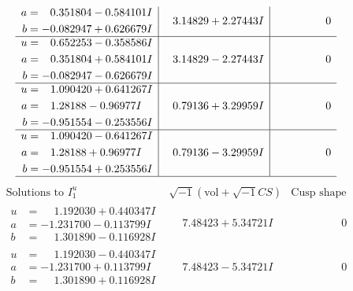 \documentclass[1p]{elsarticle_modified}
\theoremstyle{definition}
\newcommand{\I}{\sqrt{-1}}
\begin{document}
$$\begin{array}{c|c|c}
\begin{aligned}
a &= \phantom{-}0.351804 - 0.584101 I \\
b &= -0.082947 + 0.626679 I\end{aligned}
 & \phantom{-}3.14829 + 2.27443 I & \phantom{-0.000000 } 0 \\ \hline\begin{aligned}
u &= \phantom{-}0.652253 - 0.358586 I \\
a &= \phantom{-}0.351804 + 0.584101 I \\
b &= -0.082947 - 0.626679 I\end{aligned}
 & \phantom{-}3.14829 - 2.27443 I & \phantom{-0.000000 } 0 \\ \hline\begin{aligned}
u &= \phantom{-}1.090420 + 0.641267 I \\
a &= \phantom{-}1.28188 - 0.96977 I \\
b &= -0.951554 - 0.253556 I\end{aligned}
 & \phantom{-}0.79136 + 3.29959 I & \phantom{-0.000000 } 0 \\ \hline\begin{aligned}
u &= \phantom{-}1.090420 - 0.641267 I \\
a &= \phantom{-}1.28188 + 0.96977 I \\
b &= -0.951554 + 0.253556 I\end{aligned}
 & \phantom{-}0.79136 - 3.29959 I & \phantom{-0.000000 } 0\\
 \hline 
 \end{array}$$\newpage$$\begin{array}{c|c|c}  
\text{Solutions to }I^u_{1}& \I (\text{vol} + \sqrt{-1}CS) & \text{Cusp shape}\\
 \hline 
\begin{aligned}
u &= \phantom{-}1.192030 + 0.440347 I \\
a &= -1.231700 - 0.113799 I \\
b &= \phantom{-}1.301890 - 0.116928 I\end{aligned}
 & \phantom{-}7.48423 + 5.34721 I & \phantom{-0.000000 } 0 \\ \hline\begin{aligned}
u &= \phantom{-}1.192030 - 0.440347 I \\
a &= -1.231700 + 0.113799 I \\
b &= \phantom{-}1.301890 + 0.116928 I\end{aligned}
 & \phantom{-}7.48423 - 5.34721 I & \phantom{-0.000000 } 0 \\ \hline\begin{aligned}

\end{aligned}
\end{array}$$
\end{document}
